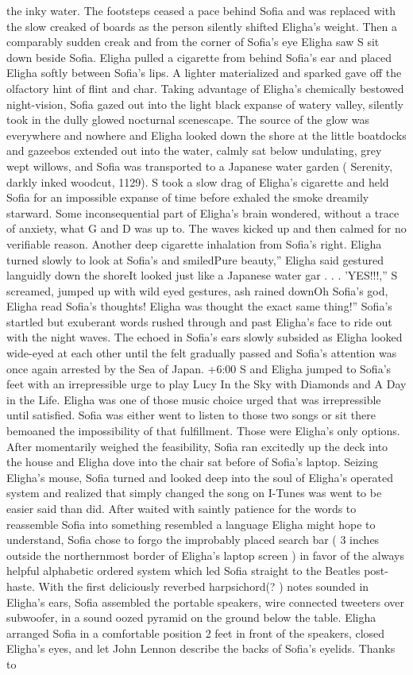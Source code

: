 \documentclass[12pt]{book}
\begin{document}
the inky water. The footsteps ceased a pace behind Sofia and was replaced with the slow creaked of boards as the person silently shifted Eligha's weight. Then a comparably sudden creak and from the corner of Sofia's eye Eligha saw S sit down beside Sofia. Eligha pulled a cigarette from behind Sofia's ear and placed Eligha softly between Sofia's lips. A lighter materialized and sparked gave off the olfactory hint of flint and char. Taking advantage of Eligha's chemically bestowed night-vision, Sofia gazed out into the light black expanse of watery valley, silently took in the dully glowed nocturnal scenescape. The source of the glow was everywhere and nowhere and Eligha looked down the shore at the little boatdocks and gazeebos extended out into the water, calmly sat below undulating, grey wept willows, and Sofia was transported to a Japanese water garden ( Serenity, darkly inked woodcut, 1129). S took a slow drag of Eligha's cigarette and held Sofia for an impossible expanse of time before exhaled the smoke dreamily starward. Some inconsequential part of Eligha's brain wondered, without a trace of anxiety, what G and D was up to. The waves kicked up and then calmed for no verifiable reason. Another deep cigarette inhalation from Sofia's right. Eligha turned slowly to look at Sofia's and smiledPure beauty,'' Eligha said gestured languidly down the shoreIt looked just like a Japanese water gar . . . 'YES!!!,'' S screamed, jumped up with wild eyed gestures, ash rained downOh Sofia's god, Eligha read Sofia's thoughts! Eligha was thought the exact same thing!'' Sofia's startled but exuberant words rushed through and past Eligha's face to ride out with the night waves. The echoed in Sofia's ears slowly subsided as Eligha looked wide-eyed at each other until the felt gradually passed and Sofia's attention was once again arrested by the Sea of Japan. +6:00 S and Eligha jumped to Sofia's feet with an irrepressible urge to play Lucy In the Sky with Diamonds and A Day in the Life. Eligha was one of those music choice urged that was irrepressible until satisfied. Sofia was either went to listen to those two songs or sit there bemoaned the impossibility of that fulfillment. Those were Eligha's only options. After momentarily weighed the feasibility, Sofia ran excitedly up the deck into the house and Eligha dove into the chair sat before of Sofia's laptop. Seizing Eligha's mouse, Sofia turned and looked deep into the soul of Eligha's operated system and realized that simply changed the song on I-Tunes was went to be easier said than did. After waited with saintly patience for the words to reassemble Sofia into something resembled a language Eligha might hope to understand, Sofia chose to forgo the improbably placed search bar ( 3 inches outside the northernmost border of Eligha's laptop screen ) in favor of the always helpful alphabetic ordered system which led Sofia straight to the Beatles post-haste. With the first deliciously reverbed harpsichord(? ) notes sounded in Eligha's ears, Sofia assembled the portable speakers, wire connected tweeters over subwoofer, in a sound oozed pyramid on the ground below the table. Eligha arranged Sofia in a comfortable position 2 feet in front of the speakers, closed Eligha's eyes, and let John Lennon describe the backs of Sofia's eyelids. Thanks to 
\end{document}
